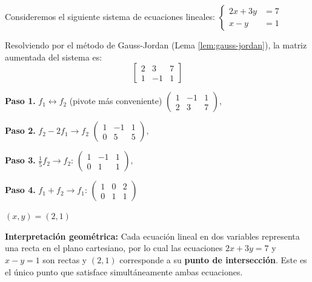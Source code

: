 \begin{example}
Consideremos el siguiente sistema de ecuaciones lineales:
$\begin{cases}
2x + 3y &= 7 \\
x - y &= 1
\end{cases}$
\begin{myproof} Resolviendo por el método de Gauss-Jordan (Lema \ref{lem:gauss-jordan}), la matriz aumentada del sistema es:
$$\left[\begin{array}{cc|c}
2 & 3 & 7 \\
1 & -1 & 1
\end{array}\right]$$

\textbf{Paso 1.} $f_1\leftrightarrow f_2$ (pivote más conveniente) $\left(\begin{array}{cc|c}
1 & -1 & 1 \\
2 & 3 & 7
\end{array}\right),$

\textbf{Paso 2.} $f_2 - 2f_1 \rightarrow f_2$ $\left(\begin{array}{cc|c}
1 & -1 & 1 \\
0 & 5 & 5
\end{array}\right),$

\textbf{Paso 3.} $\frac{1}{5}f_2 \rightarrow f_2$: $\left(\begin{array}{cc|c}
1 & -1 & 1 \\
0 & 1 & 1
\end{array}\right),$

\textbf{Paso 4.} $f_1 + f_2 \rightarrow f_1$: $\left(\begin{array}{cc|c}
1 & 0 & 2 \\
0 & 1 & 1
\end{array}\right)$

$\boxed{(x, y) = (2, 1)}$

\textbf{Interpretación geométrica:}
Cada ecuación lineal en dos variables representa una recta en el plano cartesiano, por lo cual las ecuaciones $2x + 3y = 7$ y $x - y = 1$ son rectas y $(2, 1)$ corresponde a su \textbf{punto de intersección}. Este es el único punto que satisface simultáneamente ambas ecuaciones.

\begin{figure}[H]
\centering
{}
\end{figure}
\end{myproof}
\end{example}
